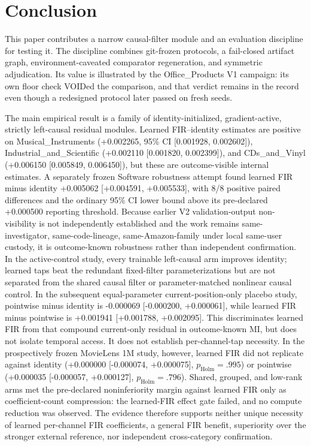 \section{Conclusion}\label{sec:7}

This paper contributes a narrow causal-filter module and an evaluation discipline for
testing it. The discipline combines git-frozen protocols, a fail-closed artifact graph,
environment-caveated comparator regeneration, and symmetric adjudication. Its value is
illustrated by the Office\_Products V1 campaign: its own floor check VOIDed the
comparison, and that verdict remains in the record even though a redesigned protocol
later passed on fresh seeds.

The main empirical result is a family of identity-initialized, gradient-active,
strictly left-causal residual modules. Learned FIR--identity estimates are positive
on Musical\_Instruments (+0.002265, 95\% CI [0.001928, 0.002602]),
Industrial\_and\_Scientific (+0.002110 [0.001820, 0.002399]), and
CDs\_and\_Vinyl (+0.006150 [0.005849, 0.006450]), but these are outcome-visible
internal estimates. A separately frozen Software robustness attempt found learned FIR
minus identity +0.005062 [+0.004591, +0.005533], with 8/8 positive paired differences
and the ordinary 95\% CI lower bound above its pre-declared +0.000500 reporting threshold.
Because earlier V2 validation-output non-visibility is not independently established and
the work remains same-investigator, same-code-lineage, same-Amazon-family under local
same-user custody, it is outcome-known robustness rather than independent confirmation.
In the active-control study, every trainable left-causal arm improves
identity; learned taps beat the redundant fixed-filter parameterizations but are not
separated from the shared causal filter or parameter-matched nonlinear causal control.
In the subsequent equal-parameter current-position-only placebo study, pointwise minus
identity is -0.000069 [-0.000200, +0.000061], while learned FIR minus pointwise is
+0.001941 [+0.001788, +0.002095]. This discriminates learned FIR from that
compound current-only residual in outcome-known MI, but does not isolate temporal
access. It does not establish per-channel-tap
necessity. In the prospectively frozen MovieLens 1M study, however, learned FIR did not
replicate against identity (+0.000000 [-0.000074, +0.000075],
$p_{\mathrm{Holm}}=.995$) or pointwise (+0.000035 [-0.000057, +0.000127],
$p_{\mathrm{Holm}}=.796$). Shared, grouped, and low-rank arms met the pre-declared
noninferiority margin against learned FIR only as coefficient-count compression: the learned-FIR
effect gate failed, and no compute reduction was observed. The evidence therefore supports neither unique necessity of learned per-channel
FIR coefficients, a general FIR benefit, superiority over the stronger external reference, nor
independent cross-category confirmation.

